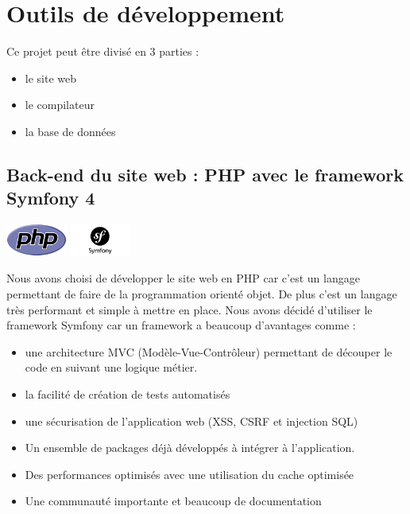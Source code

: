 \documentclass[12pt,a4paper]{article}
\begin{document}
\section{Outils de développement}

Ce projet peut être divisé en 3 parties :
\begin{itemize}  
  \item le site web
  \item le compilateur 
  \item la base de données
\end{itemize}

\subsection{Back-end du site web : PHP avec le framework Symfony 4}
\begin{center}
  \includegraphics[width=2cm]{img/php.png}
  \includegraphics[width=2cm]{img/symfony.png}
\end{center}

Nous avons choisi de développer le site web en PHP car c'est un langage permettant de faire de la programmation orienté objet. 
De plus c'est un langage très performant et simple à mettre en place.
Nous avons décidé d'utiliser le framework Symfony car un framework a beaucoup d'avantages comme :
\begin{itemize}  
  \item une architecture MVC (Modèle-Vue-Contrôleur) permettant de découper le code en suivant une logique métier.
  \item la facilité de création de tests automatisés
  \item une sécurisation de l'application web (XSS, CSRF et injection SQL)
  \item Un ensemble de packages déjà développés à intégrer à l'application.
  \item Des performances optimisés avec une utilisation du cache optimisée
  \item Une communauté importante et beaucoup de documentation
\end{itemize}

\smallbreak
\end{document}
